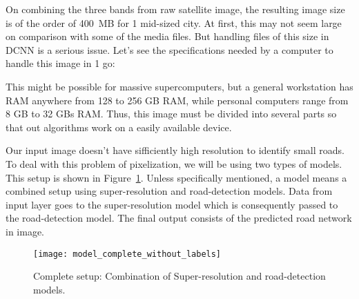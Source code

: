 On combining the three bands from raw satellite image, the resulting image size is of the order of 400~MB for 1 mid-sized city. At first, this may not seem large on comparison with some of the media files. But handling files of this size in DCNN is a serious issue. Let's see the specifications needed by a computer to handle this image in 1 go:

\par
This might be possible for massive supercomputers, but a general workstation has RAM anywhere from 128 to 256 GB RAM, while personal computers range from 8 GB to 32 GBs RAM. Thus, this image must be divided into several parts so that out algorithms work on a easily available device. \par

Our input image doesn't have sifficiently high resolution to identify small roads. To deal with this problem of pixelization, we will be using two types of models. This setup is shown in Figure~\ref{fig:model_complete_without_labels}. Unless specifically mentioned, a model means a combined setup using super-resolution and road-detection models. Data from input layer goes to the super-resolution model which is consequently passed to the road-detection model. The final output consists of the predicted road network in image. \par

\begin{figure}
  \centering
  \texttt{[image: model\_complete\_without\_labels]}
  \caption{Complete setup: Combination of Super-resolution and road-detection models.}
  \label{fig:model_complete_without_labels}
\end{figure}
